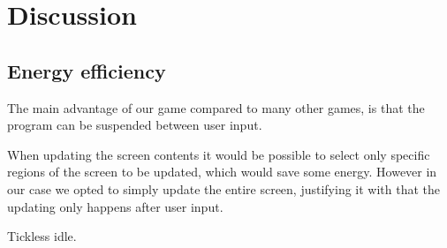 \section{Discussion}

\subsection{Energy efficiency}
The main advantage of our game compared to many other games, is that the program can be suspended between user input.

When updating the screen contents it would be possible to select only specific regions of the screen to be updated, which would save some energy.
However in our case we opted to simply update the entire screen, justifying it with that the updating only happens after user input.

Tickless idle.
